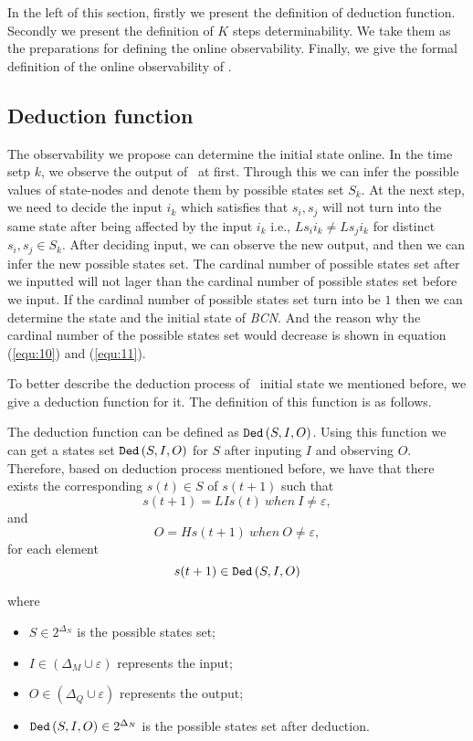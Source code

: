 In the left of this section, firstly we present the definition of deduction function. Secondly we present the definition of $K$ steps determinability. We take them as the preparations for defining the online observability. Finally, we give the formal definition of the online observability of \BCNs. 
\subsection{Deduction function}
The observability we propose can determine the initial state online.
 In the time setp $k$, we observe the output of \BCNs\ at first. Through this we can infer the possible values of state-nodes and denote them by possible states set $S_k$. %
 At the next step, we need to decide the input $i_k$ which satisfies that %
$s_i, s_j$ 
 will not turn into the same state after being affected by the input $i_k$ i.e., $Ls_i i_k\neq Ls_j i_k$ for distinct $s_i, s_j\in S_k$. After deciding input, we can observe the new output, and then we can infer the new possible states set. The cardinal number of possible states set after we inputted will not lager than the cardinal number of possible states set before we input. If the cardinal number of possible states set turn into be $1$ then we can determine the state and the initial state of {\em BCN}. And the reason why the cardinal number of the possible states set would decrease is shown in equation (\ref{equ:10}) and (\ref{equ:11}). 
 
To better describe the deduction process of \BCN\ initial state we mentioned before, we give a deduction function for it. The definition of this function is as follows.
\begin{definition} The deduction function can be defined as ${\tt Ded}\left(S, I, O\right)$. Using this function we can get a states set ${\tt Ded}\left(S, I, O\right)$ for $S$ after inputing $I$ and observing $O$. Therefore, based on deduction process mentioned before, we have that there exists the corresponding $s(t)\in S$ of $s(t+1)$ such that \[s(t+1)=LIs(t)\ when\ I\neq \varepsilon, \] and \[O=Hs(t+1)\ when\ O\neq \varepsilon, \]
for each element \[s(t+1)\in {\tt Ded}\left(S, I, O\right)\]
\end{definition}
where   
\begin{itemize}
  \item $S\in 2^{\Delta_N}$ is the possible states set;
  \item $I\in (\Delta_M\cup\varepsilon)$ represents the input;
  \item $O\in(\Delta_Q\cup\varepsilon)$ represents the output; 
  \item ${\tt Ded}\left(S, I, O\right)\in 2^{\Delta_N}$ is the possible states set after deduction.
\end{itemize} 
 
